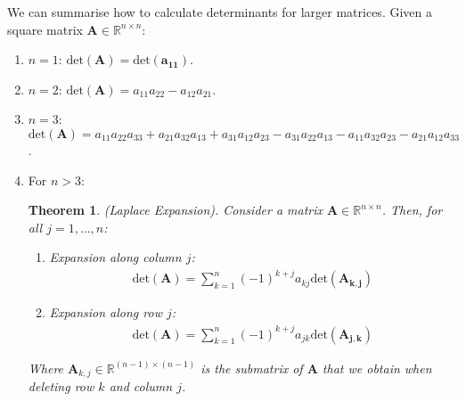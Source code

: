 \documentclass[a4paper,12pt]{book}
\newcommand{\matrx}[1]{\bm{#1}}
\newcommand{\real}{\mathbb{R}}
\newcommand{\dett}[1]{\text{det}(\matrx{#1})}
\newtheorem{theorem}{Theorem}[section]
\begin{document}
	We can summarise how to calculate determinants for larger matrices. Given a square matrix $ \matrx{A} \in \real^{n \times n} $:
	\begin{enumerate}
		\item $ n = 1 $: $ \dett{A} = \dett{a_{11}} $.
		\item $ n = 2 $: $ \dett{A} = a_{11}a_{22} - a_{12}a_{21} $.
		\item $ n = 3 $: $ \dett{A} = a_{11}a_{22}a_{33} + a_{21}a_{32}a_{13} + a_{31}a_{12}a_{23} - a_{31}a_{22}a_{13} - a_{11}a_{32}a_{23} - a_{21}a_{12}a_{33}$.
		\item For $ n > 3 $: \begin{theorem}
			\normalfont (Laplace Expansion). Consider a matrix $ \matrx{A} \in \real^{n \times n} $. Then, for all $ j = 1,\ldots,n $:
			\begin{enumerate}
				\item Expansion along column $ j $:
				\begin{align}
					\dett{A} = \sum_{k = 1}^{n} (-1)^{k + j} a_{kj} \dett{A_{k,j}}
				\end{align}
				\item Expansion along row $ j $:
				\begin{align}
					\dett{A} = \sum_{k = 1}^{n} (-1)^{k + j} a_{jk} \dett{A_{j,k}}
				\end{align}
			\end{enumerate}
		Where $ \matrx{A}_{k,j} \in \real^{(n - 1) \times (n - 1)} $ is the submatrix of $ \matrx{A} $ that we obtain when deleting row $ k $ and column $ j $. 
		\end{theorem}
	\end{enumerate}

	\printbibliography
\end{document}
